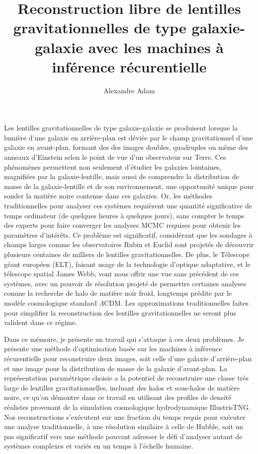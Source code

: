 \documentclass[
  normalmargins,
  11pt,
  openany,
  onehalfspacing,
]{ut-thesis}
\author{Alexandre Adam}
\title{Reconstruction libre de lentilles gravitationnelles de type galaxie-galaxie avec les machines à inférence récurentielle}
\begin{document}
  \frontmatter
    \maketitle


    \begin{resume}
	Les lentilles gravitationnelles de type galaxie-galaxie se produisent lorsque la lumière d'une galaxie 
	en arrière-plan est déviée par le champ gravitationnel d'une galaxie en avant-plan, formant des 
	des images doubles, quadruples ou même des anneaux d'Einstein selon le point de vue d'un observateur sur Terre. 
	Ces phénomènes permettent non seulement 
	d'étudier les galaxies lointaines, magnifiées par la galaxie-lentille, mais aussi de comprendre la distribution 
	de masse de la galaxie-lentille et de son environnement, une opportunité unique pour 
	sonder la matière noire contenue dans ces galaxies. 
	Or, les méthodes traditionnelles pour analyser ces systèmes requièrent une quantité 
	significative de temps ordinateur (de quelques heures à quelques jours), sans compter le temps des 
	experts pour faire converger les analyses MCMC requises pour obtenir les paramètres d'intérêts. 
	Ce problème est significatif, considérant que 
	les sondages à champs larges comme les observatoires Rubin et Euclid sont projetés de découvrir plusieurs 
	centaines de milliers de lentilles gravitationnelles.  
	De plus, le Télescope géant européen (ELT), faisant usage de la technologie d'optique adaptative, 
	et le télescope spatial James Webb, vont nous offrir une vue sans précédent de ces systèmes, avec un 
	pouvoir de résolution projeté de permettre certaines analyses comme la recherche de halo de matière noir froid, 
	longtemps prédite par le modèle cosmologique standard $\Lambda$CDM. Les approximations traditionnelles faites pour 
	simplifier la reconstruction des lentilles gravitationnelles ne seront plus valident dans ce régime.

	Dans ce mémoire, je présente un travail qui s'attaque à ces deux problèmes. Je présente une 
	méthode d'optimisation basée sur les machines à inférence récurentielle pour reconstruire 
	deux images, soit celle d'une galaxie d'arrière-plan et une image pour la distribution de masse 
	de la galaxie d'avant-plan. La représentation paramétrique choisie a la potentiel de reconstruire 
	une classe très large de lentilles gravitationnelles, incluant des halos et sous-halos de matière noire, 
	ce qu'on démontre dans ce travail en utilisant des profiles de densité réalistes provenant de 
	la simulation cosmologique hydrodynamique IllustrisTNG. 
	Nos reconstructions s'exécutent sur une fraction du temps requis pour exécuter une analyse traditionnelle, à 
	une résolution similaire à celle de Hubble, soit un pas 
	significatif vers une méthode pouvant adresser le défi d'analyser autant de systèmes complexes et variés en 
	un temps à l'échelle humaine.

    \end{resume}
\end{document}
